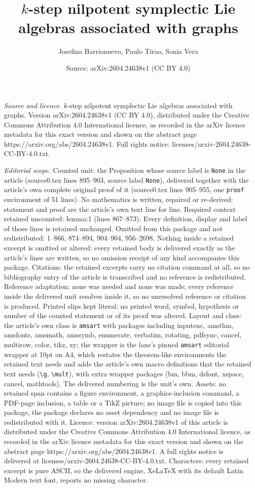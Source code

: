 \documentclass[10pt,a4paper]{amsart}
\title[$k$-step nilpotent symplectic Lie algebras associated with g]{$k$-step nilpotent symplectic Lie algebras associated with graphs}
\author{Josefina Barrionuevo, Paulo Tirao, Sonia Vera}
\date{Source: arXiv:2604.24638v1 (CC BY 4.0)}
\begin{document}
\maketitle

\noindent\emph{Source and licence.} $k$-step nilpotent symplectic Lie algebras associated with graphs. Version arXiv:2604.24638v1 (CC BY 4.0), distributed under the Creative Commons Attribution 4.0 International licence, as recorded in the arXiv licence metadata for this exact version and shown on the abstract page https://arxiv.org/abs/2604.24638v1. Full rights notice: licenses/arxiv-2604.24638-CC-BY-4.0.txt.\par\smallskip

\noindent\textit{Editorial scope.} Counted unit: the Proposition whose source label is \texttt{None} in the article (source0.tex lines 895--903, source label \texttt{None}), delivered together with the article's own complete original proof of it (source0.tex lines 905--955, one \texttt{proof} environment of 51 lines). No mathematics is written, repaired or re-derived: statement and proof are the article's own text line for line. Required context retained uncounted: lemma:1 (lines 867--873). Every definition, display and label of those lines is retained unchanged. Omitted from this package and not redistributed: 1--866, 874--894, 904--904, 956--2698. Nothing inside a retained excerpt is omitted or altered: every retained body is delivered exactly as the article's lines are written, so no omission receipt of any kind accompanies this package. Citations: the retained excerpts carry no citation command at all, so no bibliography entry of the article is transcribed and no reference is redistributed. Reference adaptation: none was needed and none was made; every reference inside the delivered unit resolves inside it, so no unresolved reference or citation is produced. Printed slips kept literal: no printed word, symbol, hypothesis or number of the counted statement or of its proof was altered. Layout and class: the article's own class is \texttt{amsart} with packages including inputenc, amsthm, amsfonts, amsmath, amssymb, enumerate, verbatim, rotating, pdfsync, cancel, multirow, color, tikz, xy; the wrapper is the lane's pinned \texttt{amsart} editorial wrapper at 10pt on A4, which restates the theorem-like environments the retained text needs and adds the article's own macro definitions that the retained text needs (\texttt{\textbackslash g}, \texttt{\textbackslash mult}), with extra wrapper packages (bm, bbm, dsfont, xspace, cancel, mathtools). The delivered numbering is the unit's own. Assets: no retained span contains a figure environment, a graphics-inclusion command, a PDF-page inclusion, a table or a TikZ picture; no image file is copied into this package, the package declares no asset dependency and no image file is redistributed with it. Licence: version arXiv:2604.24638v1 of this article is distributed under the Creative Commons Attribution 4.0 International licence, as recorded in the arXiv licence metadata for this exact version and shown on the abstract page https://arxiv.org/abs/2604.24638v1. A full rights notice is delivered at licenses/arxiv-2604.24638-CC-BY-4.0.txt. Characters: every retained excerpt is pure ASCII, so the delivered engine, XeLaTeX with its default Latin Modern text font, reports no missing character.
\end{document}
